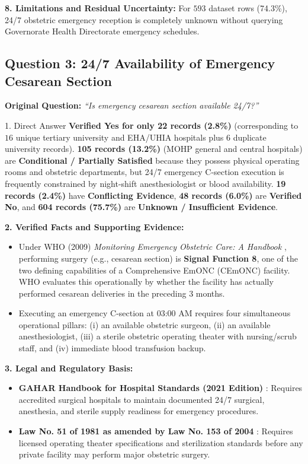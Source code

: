 \documentclass[10pt,a4paper]{article}
\begin{document}
\textbf{8. Limitations and Residual Uncertainty:}
For $593$ dataset rows (74.3\%), 24/7 obstetric emergency reception is completely unknown without querying Governorate Health Directorate emergency schedules.

\subsection{Question 3: 24/7 Availability of Emergency Cesarean Section}
\textbf{Original Question:} \textit{``Is emergency cesarean section available 24/7?''}

\begin{auditbox}{1. Direct Answer}
\textbf{Verified Yes for only 22 records (2.8\%)} (corresponding to $16$ unique tertiary university and EHA/UHIA hospitals plus $6$ duplicate university records). \textbf{105 records (13.2\%)} (MOHP general and central hospitals) are \textbf{Conditional / Partially Satisfied} because they possess physical operating rooms and obstetric departments, but 24/7 emergency C-section execution is frequently constrained by night-shift anesthesiologist or blood availability. \textbf{19 records (2.4\%)} have \textbf{Conflicting Evidence}, \textbf{48 records (6.0\%)} are \textbf{Verified No}, and \textbf{604 records (75.7\%)} are \textbf{Unknown / Insufficient Evidence}.
\end{auditbox}

\textbf{2. Verified Facts and Supporting Evidence:}
\begin{itemize}
    \item Under WHO (2009) \textit{Monitoring Emergency Obstetric Care: A Handbook} \cite{who2009emonc}, performing surgery (e.g., cesarean section) is \textbf{Signal Function 8}, one of the two defining capabilities of a Comprehensive EmONC (CEmONC) facility. WHO evaluates this operationally by whether the facility has actually performed cesarean deliveries in the preceding 3 months.
    \item Executing an emergency C-section at 03:00 AM requires four simultaneous operational pillars: (i) an available obstetric surgeon, (ii) an available anesthesiologist, (iii) a sterile obstetric operating theater with nursing/scrub staff, and (iv) immediate blood transfusion backup.
\end{itemize}

\textbf{3. Legal and Regulatory Basis:}
\begin{itemize}
    \item \textbf{GAHAR Handbook for Hospital Standards (2021 Edition)} \cite{gahar2021hospital}: Requires accredited surgical hospitals to maintain documented 24/7 surgical, anesthesia, and sterile supply readiness for emergency procedures.
    \item \textbf{Law No. 51 of 1981 as amended by Law No. 153 of 2004} \cite{egypt_law_51_1981_153_2004}: Requires licensed operating theater specifications and sterilization standards before any private facility may perform major obstetric surgery.
\end{itemize}
\end{document}
